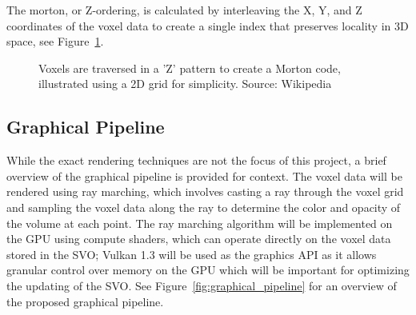 \documentclass{article}
\begin{document}
The morton, or Z-ordering, is calculated by interleaving the X, Y, and Z coordinates of the voxel data to create a single index that preserves locality in 3D space, see Figure~\ref{fig:morton}.

\begin{figure}[thp]
    \begin{center}
    \end{center}
    \caption{Voxels are traversed in a 'Z' pattern to create a Morton code, illustrated using a 2D grid for simplicity. Source: Wikipedia}
    \label{fig:morton}
\end{figure}

\subsection{Graphical Pipeline}
While the exact rendering techniques are not the focus of this project, a brief overview of the graphical pipeline is provided for context. The voxel data will be rendered using ray marching, which involves casting a ray through the voxel grid and sampling the voxel data along the ray to determine the color and opacity of the volume at each point. The ray marching algorithm will be implemented on the GPU using compute shaders, which can operate directly on the voxel data stored in the SVO; Vulkan 1.3 will be used as the graphics API as it allows granular control over memory on the GPU which will be important for optimizing the updating of the SVO. See Figure~\ref{fig:graphical_pipeline} for an overview of the proposed graphical pipeline.
\end{document}
